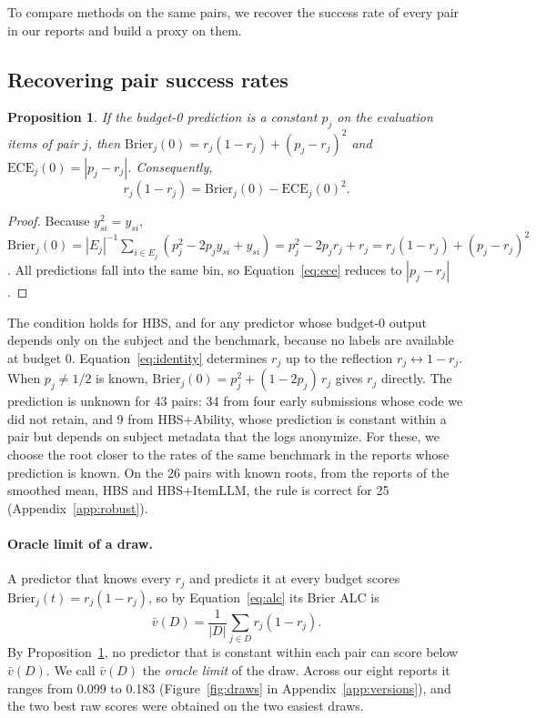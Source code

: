 \documentclass{article}
\newtheorem{proposition}{Proposition}
\newcommand{\Brier}{\mathrm{Brier}}
\newcommand{\ECE}{\mathrm{ECE}}
\begin{document}
To compare methods on the same pairs, we recover the success rate of every pair in our reports and build a proxy on them.

\subsection{Recovering pair success rates}

\begin{proposition}
  \label{prop:identity}
  If the budget-0 prediction is a constant $p_j$ on the evaluation items of pair $j$, then $\Brier_j(0) = r_j(1 - r_j) + (p_j - r_j)^2$ and $\ECE_j(0) = |p_j - r_j|$. Consequently,
  \begin{equation}
    r_j (1 - r_j) = \Brier_j(0) - \ECE_j(0)^2 .
    \label{eq:identity}
  \end{equation}
\end{proposition}

\begin{proof}
  Because $y_{si}^2 = y_{si}$, $\Brier_j(0) = |E_j|^{-1} \sum_{i \in E_j} (p_j^2 - 2 p_j y_{si} + y_{si}) = p_j^2 - 2 p_j r_j + r_j = r_j(1 - r_j) + (p_j - r_j)^2$. All predictions fall into the same bin, so Equation~\eqref{eq:ece} reduces to $|p_j - r_j|$.
\end{proof}

The condition holds for HBS, and for any predictor whose budget-0 output depends only on the subject and the benchmark, because no labels are available at budget 0. Equation~\eqref{eq:identity} determines $r_j$ up to the reflection $r_j \leftrightarrow 1 - r_j$. When $p_j \neq 1/2$ is known, $\Brier_j(0) = p_j^2 + (1 - 2p_j)\, r_j$ gives $r_j$ directly. The prediction is unknown for 43 pairs: 34 from four early submissions whose code we did not retain, and 9 from HBS+Ability, whose prediction is constant within a pair but depends on subject metadata that the logs anonymize. For these, we choose the root closer to the rates of the same benchmark in the reports whose prediction is known. On the 26 pairs with known roots, from the reports of the smoothed mean, HBS and HBS+ItemLLM, the rule is correct for 25 (Appendix~\ref{app:robust}).

\paragraph{Oracle limit of a draw.} A predictor that knows every $r_j$ and predicts it at every budget scores $\Brier_j(t) = r_j(1 - r_j)$, so by Equation~\eqref{eq:alc} its Brier ALC is
\begin{equation}
  \bar v(D) = \frac{1}{|D|} \sum_{j \in D} r_j (1 - r_j).
\end{equation}
By Proposition~\ref{prop:identity}, no predictor that is constant within each pair can score below $\bar v(D)$. We call $\bar v(D)$ the \emph{oracle limit} of the draw. Across our eight reports it ranges from 0.099 to 0.183 (Figure~\ref{fig:draws} in Appendix~\ref{app:versions}), and the two best raw scores were obtained on the two easiest draws.
\end{document}
